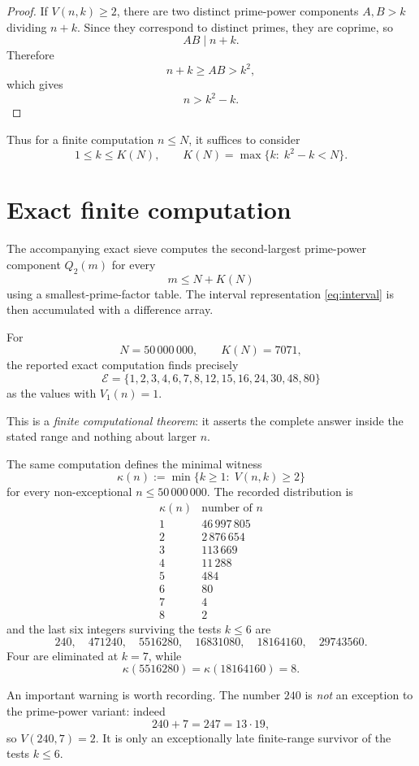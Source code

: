 \documentclass[11pt]{article}
\newcommand{\EE}{\mathcal E}
\begin{document}
\begin{proof}
If \(V(n,k)\geq2\), there are two distinct prime-power components
\(A,B>k\) dividing \(n+k\).  Since they correspond to distinct primes,
they are coprime, so
\[
AB\mid n+k.
\]
Therefore
\[
n+k\geq AB>k^2,
\]
which gives
\[
n>k^2-k.
\]
\end{proof}

Thus for a finite computation \(n\leq N\), it suffices to consider
\[
1\leq k\leq K(N),
\qquad
K(N)=\max\{k:\;k^2-k<N\}.
\]

\section{Exact finite computation}

The accompanying exact sieve computes the second-largest prime-power
component \(Q_2(m)\) for every
\[
m\leq N+K(N)
\]
using a smallest-prime-factor table.  The interval representation
\eqref{eq:interval} is then accumulated with a difference array.

For
\[
N=50\,000\,000,
\qquad
K(N)=7071,
\]
the reported exact computation finds precisely
\[
\boxed{
\EE=
\{1,2,3,4,6,7,8,12,15,16,24,30,48,80\}
}
\tag{2}
\]
as the values with \(V_1(n)=1\).

This is a \emph{finite computational theorem}: it asserts the complete answer
inside the stated range and nothing about larger \(n\).

The same computation defines the minimal witness
\[
\kappa(n):=\min\{k\geq1:\;V(n,k)\geq2\}
\]
for every non-exceptional \(n\leq50\,000\,000\).  The recorded distribution is
\[
\begin{array}{c|r}
\kappa(n)&\text{number of }n\\
\hline
1&46\,997\,805\\
2&2\,876\,654\\
3&113\,669\\
4&11\,288\\
5&484\\
6&80\\
7&4\\
8&2
\end{array}
\tag{3}\label{eq:decomp}
\]
and the last six integers surviving the tests \(k\leq6\) are
\[
240,\quad
471240,\quad
5516280,\quad
16831080,\quad
18164160,\quad
29743560.
\tag{4}
\]
Four are eliminated at \(k=7\), while
\[
\kappa(5516280)=\kappa(18164160)=8.
\]

An important warning is worth recording.  The number \(240\) is \emph{not}
an exception to the prime-power variant: indeed
\[
240+7=247=13\cdot19,
\]
so \(V(240,7)=2\).  It is only an exceptionally late finite-range survivor
of the tests \(k\leq6\).
\end{document}
